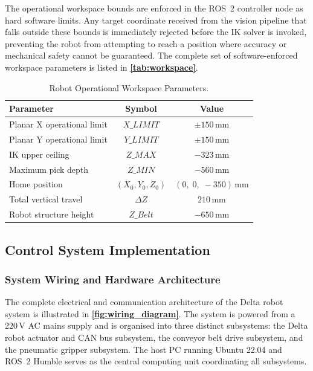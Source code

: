 \par
\hspace{1.27cm}
The operational workspace bounds are enforced in the ROS~2
controller node as hard software limits. Any target
coordinate received from the vision pipeline that falls
outside these bounds is immediately rejected before the
IK solver is invoked, preventing the robot from attempting
to reach a position where accuracy or mechanical safety
cannot be guaranteed. The complete set of software-enforced
workspace parameters is listed in
\textbf{\autoref{tab:workspace}}.
\begin{table}[ht]
    \centering
    \caption{Robot Operational Workspace Parameters.}
    \label{tab:workspace}
    {\small
    \begin{tabular}{lcc}
        \hline
        \textbf{Parameter} & \textbf{Symbol} &
        \textbf{Value} \\
        \hline
        Planar X operational limit  & $X\_LIMIT$
            & $\pm150$\,mm \\
        Planar Y operational limit  & $Y\_LIMIT$
            & $\pm150$\,mm \\
        IK upper ceiling            & $Z\_MAX$
            & $-323$\,mm \\
        Maximum pick depth          & $Z\_MIN$
            & $-560$\,mm \\
        Home position               & $(X_0,Y_0,Z_0)$
            & $(0,\;0,\;-350)$\,mm \\
        Total vertical travel       & $\Delta Z$
            & $210$\,mm \\
        Robot structure height      & $Z\_Belt$
            & $-650$\,mm \\
        \hline
    \end{tabular}}
\end{table}

\subsection{Control System Implementation}

\subsubsection{System Wiring and Hardware Architecture}
\hspace{1.27cm}
The complete electrical and communication architecture of the
Delta robot system is illustrated in
\textbf{\autoref{fig:wiring_diagram}}. The system is powered
from a 220\,V AC mains supply and is organised into three
distinct subsystems: the Delta robot actuator and CAN bus
subsystem, the conveyor belt drive subsystem, and the
pneumatic gripper subsystem. The host PC running Ubuntu
22.04 and ROS~2 Humble serves as the central computing unit
coordinating all subsystems.

